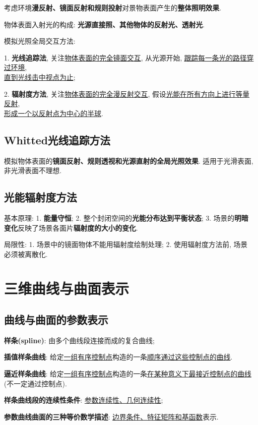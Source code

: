 \documentclass[12pt, a4paper, oneside]{ctexart}
\def\ul{\underline}         %
\def\bf{\textbf}            %
\begin{document}
考虑环境\bf{漫反射、镜面反射和规则投射}对景物表面产生的\bf{整体照明效果}.

物体表面入射光的构成: \bf{光源直接照、其他物体的反射光、透射光}.

模拟光照全局交互方法:

1. \bf{光线追踪法}, 关注\ul{物体表面的完全镜面交互}, 从光源开始, \ul{跟踪每一条光的路径穿过环境}, \\\ul{直到光线击中视点为止};

2. \bf{辐射度方法}, 关注\ul{物体表面的完全漫反射交互}, 假设\ul{光能在所有方向上进行等量反射},\\\ul{形成一个以反射点为中心的半球}.

\subsection{Whitted光线追踪方法}

模拟物体表面的\bf{镜面反射、规则透视和光源直射的全局光照效果}. 适用于光滑表面, 非光滑表面不理想.

\subsection{光能辐射度方法}

基本原理: 1. \bf{能量守恒}; 2. 整个封闭空间的\bf{光能分布达到平衡状态}; 3. 场景的\bf{明暗变化}反映了场景各面片\bf{辐射度的大小的变化}.

局限性: 1. 场景中的镜面物体不能用辐射度绘制处理; 2. 使用辐射度方法前, 场景必须被离散化.

\section{三维曲线与曲面表示}

\subsection{曲线与曲面的参数表示}

\bf{样条(spline)}: 由多个曲线段连接而成的复合曲线;

\bf{插值样条曲线}: 给定\ul{一组有序控制点}构造的一条\ul{顺序通过这些控制点的曲线}.

\bf{逼近样条曲线}: 给定\ul{一组有序控制点}构造的一条\ul{在某种意义下最接近控制点的曲线}(不一定通过控制点).

\bf{样条曲线段的连续性条件}: \ul{参数连续性、几何连续性};

\bf{参数曲线曲面的三种等价数学描述}: \ul{边界条件、特征矩阵和基函数}表示.
\end{document}
